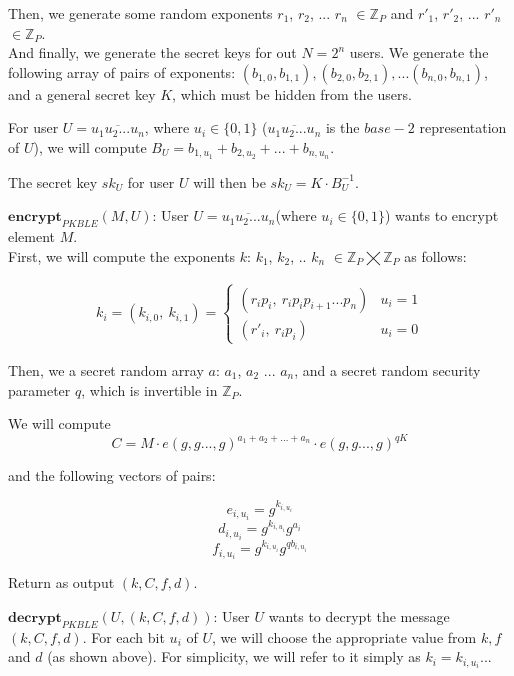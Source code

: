 \documentclass[a4paper, 12pt, oneside]{article}
\begin{document}
 
 Then, we generate some random exponents $r_1$, $r_2$, ... $r_n$ $\in \mathbb{Z}_P$ and $r'_1$, $r'_2$, ... $r'_n$ $\in \mathbb{Z}_P$. \\
 
 And finally, we generate the secret keys for out $N = 2^n$ users.
 We generate the following array of pairs of exponents:
	$(b_{1, 0}, b_{1, 1}),  (b_{2, 0}, b_{2, 1}), ... (b_{n, 0}, b_{n, 1})$, and a general secret key $K$, which must be hidden from the users.
	
	For user $U=\overline{u_1u_2...u_n}$, where $u_i \in \{0, 1\}$ ($\overline{u_1u_2...u_n}$ is the $base-2$ representation of $U$), we will compute 
	$B_U = b_{1, u_1} + b_{2, u_2} + ... + b_{n, u_n}$. 
	
	
	The secret key $sk_U$ for user $U$ will then be $sk_U = K\cdot B_U^{-1}$.
\linebreak

\textit{$\mathbf{encrypt}_{PKBLE}(M, U)$}: User $U=\overline{u_1u_2...u_n}$(where $u_i \in \{0, 1\}$) wants to encrypt element $M$.\\ 

First, we will compute the exponents $k$: $k_1$, $k_2$, .. $k_n$ $\in \mathbb{Z}_P \bigtimes \mathbb{Z}_P$ as follows:

\begin{align*}
k_i = (k_{i, 0}, \ k_{i, 1})=  \begin{cases} 
      (r_ip_i,\ r_ip_ip_{i+1}...p_n) & u_i = 1 \\
      (r'_i,\ r_ip_i) & u_i = 0 
   \end{cases}
\end{align*}
   
   Then, we a secret random array $a$: $a_1$, $a_2$ ... $a_n$, and a secret random security parameter $q$, which is invertible in $\mathbb{Z}_P$.
   
\bigskip
We will compute 
\[C = M\cdot e(g, g..., g)^{a_1+a_2+...+a_n} \cdot e(g, g..., g)^{qK}\]

and the following vectors of pairs:

\[ e_{i, u_i} = g^{k_{i, u_i}} \]
\[ d_{i, u_i} = g^{k_{i, u_i}} g^{a_i} \]
\[ f_{i, u_i} = g^{k_{i, u_i}} g^{qb_{i, u_i}} \]


Return as output $(k, C, f, d)$.
\bigskip

\textit{$\mathbf{decrypt}_{PKBLE}(U, (k, C, f, d))$}:
User $U$ wants to decrypt the message $(k, C, f, d)$. 
For each bit $u_i$ of $U$, we will choose the appropriate value from $k, f$ and $d$ (as shown above). For simplicity, we will refer to it simply as $k_i = k_{i, u_i}$...\\
\end{document}
